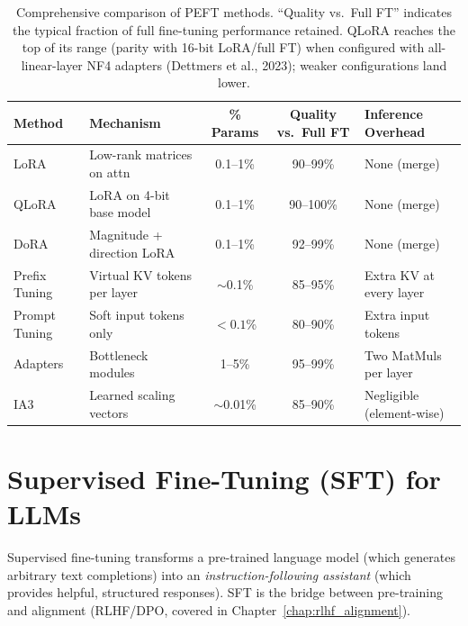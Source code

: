 \begin{table}[H]
\centering
\small
\begin{tabularx}{\textwidth}{@{}l l c c X@{}}
\toprule
\textbf{Method} & \textbf{Mechanism} & \textbf{\% Params} & \textbf{Quality vs.\ Full FT} & \textbf{Inference Overhead} \\
\midrule
LoRA          & Low-rank matrices on attn   & 0.1--1\%    & 90--99\%  & None (merge) \\
QLoRA         & LoRA on 4-bit base model    & 0.1--1\%    & 90--100\% & None (merge) \\
DoRA          & Magnitude + direction LoRA  & 0.1--1\%    & 92--99\%  & None (merge) \\
Prefix Tuning & Virtual KV tokens per layer & $\sim$0.1\% & 85--95\%  & Extra KV at every layer \\
Prompt Tuning & Soft input tokens only      & $< 0.1$\%   & 80--90\%  & Extra input tokens \\
Adapters      & Bottleneck modules          & 1--5\%      & 95--99\%  & Two MatMuls per layer \\
IA3           & Learned scaling vectors     & $\sim$0.01\%& 85--90\%  & Negligible (element-wise) \\
\bottomrule
\end{tabularx}
\caption{Comprehensive comparison of PEFT methods.  ``Quality vs.\ Full FT'' indicates
the typical fraction of full fine-tuning performance retained.  QLoRA reaches
the top of its range (parity with 16-bit LoRA/full FT) when configured with
all-linear-layer NF4 adapters (Dettmers et al., 2023); weaker configurations
land lower.}
\label{tab:peft-comparison}
\end{table}


\section{Supervised Fine-Tuning (SFT) for LLMs}
\label{sec:sft}

Supervised fine-tuning transforms a pre-trained language model (which generates
arbitrary text completions) into an \emph{instruction-following assistant}
(which provides helpful, structured responses).  SFT is the bridge between
pre-training and alignment (RLHF/DPO, covered in Chapter~\ref{chap:rlhf_alignment}).

